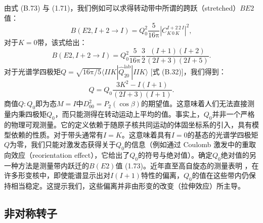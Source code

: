 由式 (B.73) 与 (1.71)，我们例如可以求得转动带中所谓的跨跃（stretched）$BE2$值：
\begin{equation}
B(E2,I+2\rightarrow I)=Q^{2}_{0}\frac{5}{16\mathrm{\pi}}|C^{I+2\,2\,I}_{K\,0\,K}|^{2},\label{eq:1.73}
\end{equation}
对于$K=0$带，该式给出：
\begin{equation}
B(E2,I+2\rightarrow I)=Q^{2}_{0}\frac{5}{16\mathrm{\pi}}\frac{3}{2}\frac{(I+1)(I+2)}{(2I+3)(2I+5)}.\label{eq:1.74}
\end{equation}
对于光谱学四极矩$Q=\sqrt{16\mathrm{\pi}/5}\langle IIK|\hat{Q}^{\text{lab}}_{20}|IIK\rangle$
{[}式 (B.32){]}，我们得到：
\begin{equation}
Q=Q_{0}\frac{3K^{2}-I(I+1)}{(2I+3)(I+1)}.\label{eq:1.75}
\end{equation}
商值$Q:Q_{0}$即为态$M=I$中$D^{2}_{00}=P_{2}(\cos\beta)$的期望值。这意味着人们无法直接测量内秉四极矩$Q_{0}$，而只能测得在转动运动上平均的值。事实上，$Q_{0}$并非一个严格的物理可观测量。它的定义依赖于随原子核共同运动的体固坐标系的引入，具有模型依赖的性质。对于带头通常有$I=K$。这意味着具有$I=0$的基态的光谱学四极矩$Q$为零，我们只能对激发态获得关于$Q_{0}$的信息（例如通过
Coulomb 激发中的重取向效应（reorientation effect）\cite{BE68}，它给出了$Q_{0}$的符号与绝对值）。确定$Q_{0}$绝对值的另一种方法是测量带内跃迁的$B(E2)$值
(1.73)。近年直至高自旋态的测量表明 \cite{WCL76,HJE78}，在许多形变核中，即使能谱显示出对$I(I+1)$特性的偏离，$Q_{0}$的值在这些带内仍保持相当稳定。这提示我们，这些偏离并非由形变的改变（拉伸效应）所主导。

\subsection{非对称转子\label{subsec:=00975E=005BF9=0079F0=008F6C=005B50}}

